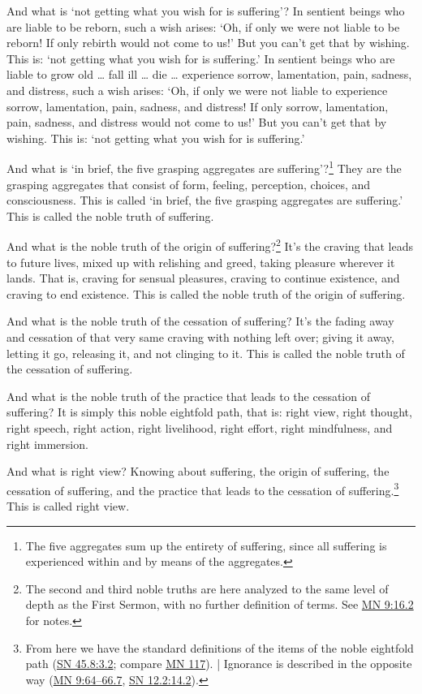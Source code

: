 \documentclass[12pt,openany]{book}%
\begin{document}
And what is ‘not getting what you wish for is suffering’? In sentient beings who are liable to be reborn, such a wish arises: ‘Oh, if only we were not liable to be reborn! If only rebirth would not come to us!’ But you can’t get that by wishing. This is: ‘not getting what you wish for is suffering.’ In sentient beings who are liable to grow old … fall ill … die … experience sorrow, lamentation, pain, sadness, and distress, such a wish arises: ‘Oh, if only we were not liable to experience sorrow, lamentation, pain, sadness, and distress! If only sorrow, lamentation, pain, sadness, and distress would not come to us!’ But you can’t get that by wishing. This is: ‘not getting what you wish for is suffering.’ 

And what is ‘in brief, the five grasping aggregates are suffering’?\footnote{The five aggregates sum up the entirety of suffering, since all suffering is experienced within and by means of the aggregates. } They are the grasping aggregates that consist of form, feeling, perception, choices, and consciousness. This is called ‘in brief, the five grasping aggregates are suffering.’ This is called the noble truth of suffering. 

And what is the noble truth of the origin of suffering?\footnote{The second and third noble truths are here analyzed to the same level of depth as the First Sermon, with no further definition of terms. See \href{https://suttacentral.net/mn9/en/sujato\#16.2}{MN 9:16.2} for notes. } It’s the craving that leads to future lives, mixed up with relishing and greed, taking pleasure wherever it lands. That is, craving for sensual pleasures, craving to continue existence, and craving to end existence. This is called the noble truth of the origin of suffering. 

And what is the noble truth of the cessation of suffering? It’s the fading away and cessation of that very same craving with nothing left over; giving it away, letting it go, releasing it, and not clinging to it. This is called the noble truth of the cessation of suffering. 

And what is the noble truth of the practice that leads to the cessation of suffering? It is simply this noble eightfold path, that is: right view, right thought, right speech, right action, right livelihood, right effort, right mindfulness, and right immersion. 

And what is right view? Knowing about suffering, the origin of suffering, the cessation of suffering, and the practice that leads to the cessation of suffering.\footnote{From here we have the standard definitions of the items of the noble eightfold path (\href{https://suttacentral.net/sn45.8/en/sujato\#3.2}{SN 45.8:3.2}; compare \href{https://suttacentral.net/mn117/en/sujato}{MN 117}). | Ignorance is described in the opposite way (\href{https://suttacentral.net/mn9/en/sujato\#64-66.7}{MN 9:64–66.7}, \href{https://suttacentral.net/sn12.2/en/sujato\#14.2}{SN 12.2:14.2}). } This is called right view. 
\end{document}
